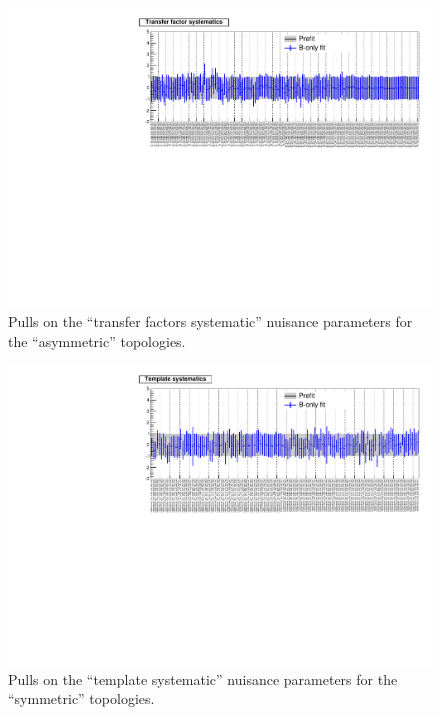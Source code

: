 \newpage
\begin{landscape}
\begin{figure}[h!]
\caption{Pulls on the ``transfer factors systematic'' nuisance parameters for the ``asymmetric'' topologies.\label{fig:nuisPull_TF_asym}}
    \includegraphics[width=\linewidth]{figures/postFitResults/TF_asym_ALL_nuisances.pdf}
\end{figure}
\end{landscape}



\newpage
\begin{landscape}
\begin{figure}[h!]
\caption{Pulls on the ``template systematic'' nuisance parameters for the ``symmetric'' topologies.\label{fig:nuisPull_template_sym}}
    \includegraphics[width=\linewidth]{figures/postFitResults/template_sym_ALL_nuisances.pdf}
\end{figure}
\end{landscape}



